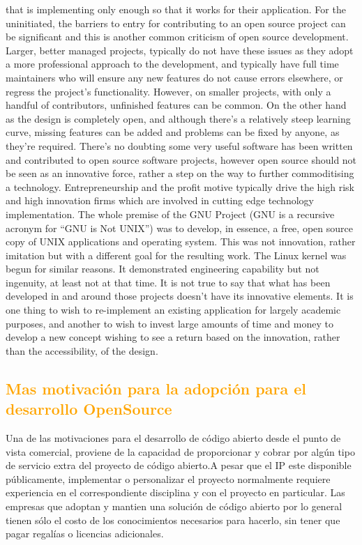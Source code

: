 \documentclass[a4paper,11pt]{article}
\begin{document}
that is implementing only enough so that it works for their application. For the
uninitiated, the barriers to entry for contributing to an open source project can
be significant and this is another common criticism of open source development.
Larger, better managed projects, typically do not have these issues as they adopt a
more professional approach to the development, and typically have full time maintainers
who will ensure any new features do not cause errors elsewhere, or regress
the project’s functionality. However, on smaller projects, with only a handful of
contributors, unfinished features can be common. On the other hand as the design
is completely open, and although there’s a relatively steep learning curve, missing
features can be added and problems can be fixed by anyone, as they’re required.
There’s no doubting some very useful software has been written and contributed
to open source software projects, however open source should not be seen as an innovative
force, rather a step on the way to further commoditising a technology.
Entrepreneurship and the profit motive typically drive the high risk and high innovation
firms which are involved in cutting edge technology implementation. The
whole premise of the GNU Project (GNU is a recursive acronym for “GNU is Not
UNIX”) was to develop, in essence, a free, open source copy of UNIX applications
and operating system. This was not innovation, rather imitation but with a different
goal for the resulting work. The Linux kernel was begun for similar reasons.
It demonstrated engineering capability but not ingenuity, at least not at that time.
It is not true to say that what has been developed in and around those projects
doesn’t have its innovative elements. It is one thing to wish to re-implement an
existing application for largely academic purposes, and another to wish to invest
large amounts of time and money to develop a new concept wishing to see a return
based on the innovation, rather than the accessibility, of the design.

		\subsection{\textcolor{orange}{Mas motivación para la adopción para el desarrollo OpenSource}}

Una de las motivaciones para el desarrollo de código abierto desde el punto de vista comercial,  proviene de la capacidad de proporcionar y cobrar por algún tipo de servicio extra del proyecto de código abierto.A pesar que el IP este disponible públicamente, implementar o personalizar el proyecto normalmente requiere experiencia en el correspondiente disciplina y con el proyecto en particular. Las empresas que adoptan y mantien una solución de código abierto por lo general tienen sólo el costo de los conocimientos necesarios para hacerlo, sin tener que pagar regalías o licencias adicionales.  
\end{document}
